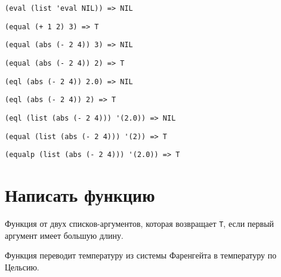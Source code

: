 \problem \hfill
\begin{lstlisting}
(eval (list 'eval NIL)) => NIL
\end{lstlisting}


\problem \hfill
\begin{lstlisting}
(equal (+ 1 2) 3) => T
\end{lstlisting}


\problem \hfill
\begin{lstlisting}
(equal (abs (- 2 4)) 3) => NIL
\end{lstlisting}


\problem \hfill
\begin{lstlisting}
(equal (abs (- 2 4)) 2) => T
\end{lstlisting}


\problem \hfill
\begin{lstlisting}
(eql (abs (- 2 4)) 2.0) => NIL
\end{lstlisting}


\problem \hfill
\begin{lstlisting}
(eql (abs (- 2 4)) 2) => T 
\end{lstlisting}


\problem \hfill
\begin{lstlisting}
(eql (list (abs (- 2 4))) '(2.0)) => NIL
\end{lstlisting}


\problem \hfill
\begin{lstlisting}
(equal (list (abs (- 2 4))) '(2)) => T
\end{lstlisting}


\problem \hfill
\begin{lstlisting}
(equalp (list (abs (- 2 4))) '(2.0)) => T 
\end{lstlisting}



\section{Написать функцию}

\problem Функция от двух списков-аргументов, которая возвращает \verb|T|, если первый аргумент имеет большую длину.



\problem Функция переводит температуру из системы Фаренгейта в температуру по Цельсию.




